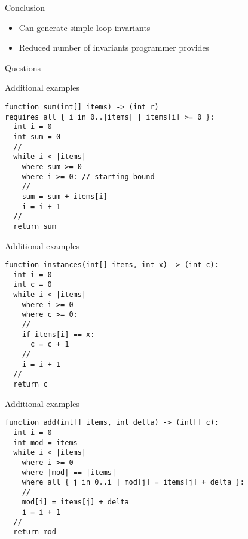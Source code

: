 \begin{frame}{Conclusion}

\begin{itemize}
\item Can generate simple loop invariants
\item Reduced number of invariants programmer provides
\end{itemize}

\end{frame}



\begin{frame}

\begin{center}
    \Huge{Questions}
\end{center}

\end{frame}

\begin{frame}[fragile]{Additional examples}

\begin{verbatim}
function sum(int[] items) -> (int r)
requires all { i in 0..|items| | items[i] >= 0 }:
  int i = 0
  int sum = 0
  //
  while i < |items|
    where sum >= 0
    where i >= 0: // starting bound
    //
    sum = sum + items[i]
    i = i + 1
  //
  return sum
\end{verbatim}

\end{frame}

\begin{frame}[fragile]{Additional examples}

\begin{verbatim}
function instances(int[] items, int x) -> (int c):
  int i = 0
  int c = 0
  while i < |items|
    where i >= 0
    where c >= 0:
    //
    if items[i] == x:
      c = c + 1
    //
    i = i + 1
  //
  return c
\end{verbatim}

\end{frame}

\begin{frame}[fragile]{Additional examples}

\begin{verbatim}
function add(int[] items, int delta) -> (int[] c):
  int i = 0
  int mod = items
  while i < |items|
    where i >= 0
    where |mod| == |items|
    where all { j in 0..i | mod[j] = items[j] + delta }:
    //
    mod[i] = items[j] + delta
    i = i + 1
  //
  return mod
\end{verbatim}

\end{frame}


